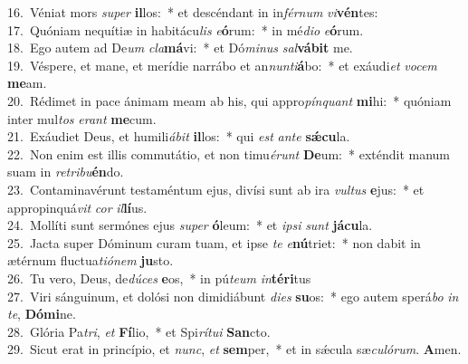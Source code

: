 {16.~}Véniat mors \textit{su}\textit{per} \textbf{il}los:~* et descéndant in in\textit{fér}\textit{num} \textit{vi}\textbf{vén}tes:\\
{17.~}Quóniam nequítiæ in habitácu\textit{lis} \textit{e}\textbf{ó}rum:~* in mé\textit{di}\textit{o} \textit{e}\textbf{ó}rum.\\
{18.~}Ego autem ad De\textit{um} \textit{cla}\textbf{má}vi:~* et Dó\textit{mi}\textit{nus} \textit{sal}\textbf{vá}\textbf{bit} me.\\
{19.~}Véspere, et mane, et merídie narrábo et an\textit{nun}\textit{ti}\textbf{á}bo:~* et exáudi\textit{et} \textit{vo}\textit{cem} \textbf{me}am.\\
{20.~}Rédimet in pace ánimam meam ab his, qui appro\textit{pín}\textit{quant} \textbf{mi}hi:~* quóniam inter mul\textit{tos} \textit{e}\textit{rant} \textbf{me}cum.\\
{21.~}Exáudiet Deus, et humili\textit{á}\textit{bit} \textbf{il}los:~* qui \textit{est} \textit{an}\textit{te} \textbf{sǽ}\textbf{cu}la.\\
{22.~}Non enim est illis commutátio, et non timu\textit{é}\textit{runt} \textbf{De}um:~* exténdit manum suam in \textit{re}\textit{tri}\textit{bu}\textbf{én}do.\\
{23.~}Contaminavérunt testaméntum ejus, divísi sunt ab ira \textit{vul}\textit{tus} \textbf{e}jus:~* et appropinquá\textit{vit} \textit{cor} \textit{il}\textbf{lí}us.\\
{24.~}Mollíti sunt sermónes ejus \textit{su}\textit{per} \textbf{ó}leum:~* et \textit{i}\textit{psi} \textit{sunt} \textbf{já}\textbf{cu}la.\\
{25.~}Jacta super Dóminum curam tuam, et ipse \textit{te} \textit{e}\textbf{nú}triet:~* non dabit in ætérnum fluctua\textit{ti}\textit{ó}\textit{nem} \textbf{ju}sto.\\
{26.~}Tu vero, Deus, de\textit{dú}\textit{ces} \textbf{e}os,~* in pú\textit{te}\textit{um} \textit{in}\textbf{té}\textbf{ri}tus\\
{27.~}Viri sánguinum, et dolósi non dimidiábunt \textit{di}\textit{es} \textbf{su}os:~* ego autem sperá\textit{bo} \textit{in} \textit{te}, \textbf{Dó}\textbf{mi}ne.\\
{28.~}Glória Pa\textit{tri}, \textit{et} \textbf{Fí}lio,~* et Spi\textit{rí}\textit{tu}\textit{i} \textbf{San}cto.\\
{29.~}Sicut erat in princípio, et \textit{nunc}, \textit{et} \textbf{sem}per,~* et in sǽcula sæ\textit{cu}\textit{ló}\textit{rum}. \textbf{A}men.\\
